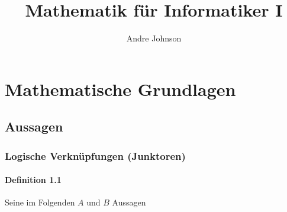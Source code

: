 \documentclass[a5paper, 10pt]{book}
\title{Mathematik für Informatiker I}
\author{Andre Johnson}
\begin{document}
	
	\maketitle
	
	\tableofcontents
	
	\chapter{Mathematische Grundlagen}
		
		\section{Aussagen}
		
			\subsection{Logische Ver\-knüp\-fung\-en (Junktoren)} 
				
				\subsubsection{Definition 1.1}
					Seine im Folgenden $A$ und $B$ Aussagen
					
\end{document}
